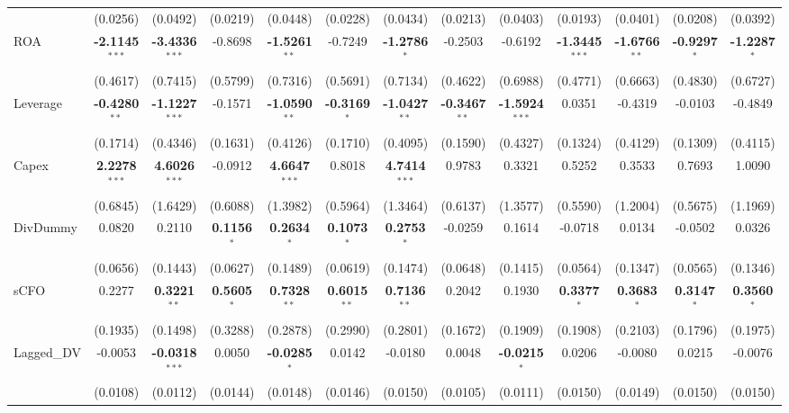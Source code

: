 \documentclass[11pt,a4paper]{article}
\begin{document}
\begin{table}[htbp]
\begin{tabular}{lcccccccccccc}
 & (0.0256) & (0.0492) & (0.0219) & (0.0448) & (0.0228) & (0.0434) & (0.0213) & (0.0403) & (0.0193) & (0.0401) & (0.0208) & (0.0392) \\
ROA & \textbf{-2.1145}$^{***}$ & \textbf{-3.4336}$^{***}$ & -0.8698 & \textbf{-1.5261}$^{**}$ & -0.7249 & \textbf{-1.2786}$^{*}$ & -0.2503 & -0.6192 & \textbf{-1.3445}$^{***}$ & \textbf{-1.6766}$^{**}$ & \textbf{-0.9297}$^{*}$ & \textbf{-1.2287}$^{*}$ \\
 & (0.4617) & (0.7415) & (0.5799) & (0.7316) & (0.5691) & (0.7134) & (0.4622) & (0.6988) & (0.4771) & (0.6663) & (0.4830) & (0.6727) \\
Leverage & \textbf{-0.4280}$^{**}$ & \textbf{-1.1227}$^{***}$ & -0.1571 & \textbf{-1.0590}$^{**}$ & \textbf{-0.3169}$^{*}$ & \textbf{-1.0427}$^{**}$ & \textbf{-0.3467}$^{**}$ & \textbf{-1.5924}$^{***}$ & 0.0351 & -0.4319 & -0.0103 & -0.4849 \\
 & (0.1714) & (0.4346) & (0.1631) & (0.4126) & (0.1710) & (0.4095) & (0.1590) & (0.4327) & (0.1324) & (0.4129) & (0.1309) & (0.4115) \\
Capex & \textbf{2.2278}$^{***}$ & \textbf{4.6026}$^{***}$ & -0.0912 & \textbf{4.6647}$^{***}$ & 0.8018 & \textbf{4.7414}$^{***}$ & 0.9783 & 0.3321 & 0.5252 & 0.3533 & 0.7693 & 1.0090 \\
 & (0.6845) & (1.6429) & (0.6088) & (1.3982) & (0.5964) & (1.3464) & (0.6137) & (1.3577) & (0.5590) & (1.2004) & (0.5675) & (1.1969) \\
DivDummy & 0.0820 & 0.2110 & \textbf{0.1156}$^{*}$ & \textbf{0.2634}$^{*}$ & \textbf{0.1073}$^{*}$ & \textbf{0.2753}$^{*}$ & -0.0259 & 0.1614 & -0.0718 & 0.0134 & -0.0502 & 0.0326 \\
 & (0.0656) & (0.1443) & (0.0627) & (0.1489) & (0.0619) & (0.1474) & (0.0648) & (0.1415) & (0.0564) & (0.1347) & (0.0565) & (0.1346) \\
sCFO & 0.2277 & \textbf{0.3221}$^{**}$ & \textbf{0.5605}$^{*}$ & \textbf{0.7328}$^{**}$ & \textbf{0.6015}$^{**}$ & \textbf{0.7136}$^{**}$ & 0.2042 & 0.1930 & \textbf{0.3377}$^{*}$ & \textbf{0.3683}$^{*}$ & \textbf{0.3147}$^{*}$ & \textbf{0.3560}$^{*}$ \\
 & (0.1935) & (0.1498) & (0.3288) & (0.2878) & (0.2990) & (0.2801) & (0.1672) & (0.1909) & (0.1908) & (0.2103) & (0.1796) & (0.1975) \\
Lagged\_DV & -0.0053 & \textbf{-0.0318}$^{***}$ & 0.0050 & \textbf{-0.0285}$^{*}$ & 0.0142 & -0.0180 & 0.0048 & \textbf{-0.0215}$^{*}$ & 0.0206 & -0.0080 & 0.0215 & -0.0076 \\
 & (0.0108) & (0.0112) & (0.0144) & (0.0148) & (0.0146) & (0.0150) & (0.0105) & (0.0111) & (0.0150) & (0.0149) & (0.0150) & (0.0150) \\

\end{tabular}
\end{table}
\end{document}
